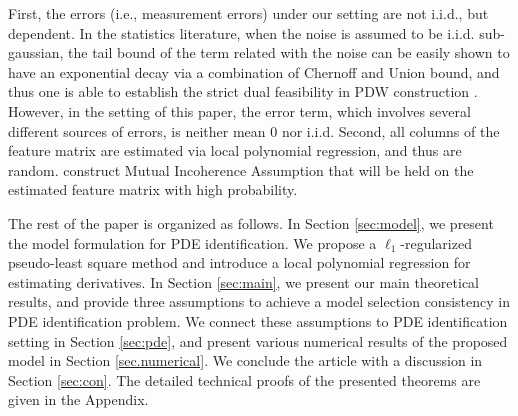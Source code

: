 \documentclass[a4paper,11pt]{article}
\theoremstyle{definition}
\newcommand{\mei}[1]{\color{blue}{#1 }\color{black}}
\begin{document}
\mei{It is not trivial to establish the theoretical properties of our proposed method of using LASSO with local polynomial approximation in PDE identification.  There are a couple of critical challenges.}  First, the errors (i.e., measurement errors) under our setting are not i.i.d., but dependent. In the statistics literature, when the noise is assumed to be i.i.d. sub-gaussian, the tail bound of the term related with the noise can be easily shown to have an exponential decay via a combination of Chernoff and Union bound, and thus  one is able to establish the strict dual feasibility in PDW construction \cite{wainwright2009sharp}.  However, in the setting of this paper, the error term, which involves several different sources of errors, is neither mean 0 nor i.i.d. Second, all columns of the feature matrix are estimated via local polynomial regression, and thus are random. \mei{As a result, we need to} construct Mutual Incoherence Assumption that will be held on the estimated feature matrix with high probability.



The rest of the paper is organized as follows. In Section \ref{sec:model}, we present the model formulation for PDE identification.  We propose a $\ell_{1}$-regularized pseudo-least square method and introduce a local polynomial regression for estimating derivatives.   In Section \ref{sec:main}, we present our main theoretical results, and provide three assumptions to achieve a model selection consistency in PDE identification problem.   We connect these assumptions to PDE identification setting  in Section \ref{sec:pde}, and present  various numerical results of the proposed model  in  Section \ref{sec.numerical}. We conclude the article with a discussion in Section \ref{sec:con}. The detailed technical proofs of the presented theorems are given in the Appendix.
\end{document}
